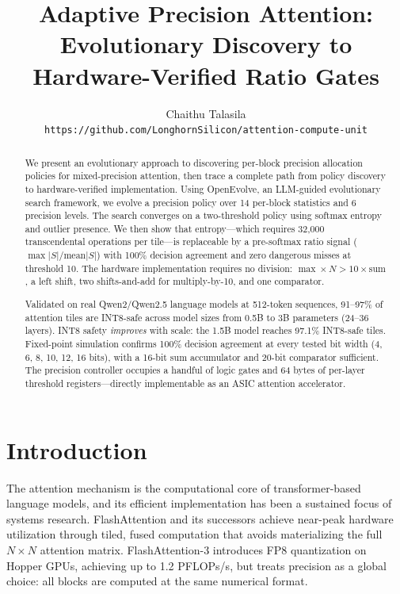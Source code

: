 \documentclass[10pt,twocolumn]{article}
\title{\textbf{Adaptive Precision Attention:\\
Evolutionary Discovery to Hardware-Verified Ratio Gates}}
\author{
  Chaithu Talasila\\
  \texttt{https://github.com/LonghornSilicon/attention-compute-unit}
}
\date{}
\begin{document}
\maketitle
\thispagestyle{fancy}

\begin{abstract}
We present an evolutionary approach to discovering per-block precision
allocation policies for mixed-precision attention, then trace a complete
path from policy discovery to hardware-verified implementation.
Using OpenEvolve, an LLM-guided evolutionary search framework, we evolve a
precision policy over 14 per-block statistics and 6 precision levels.
The search converges on a two-threshold policy using softmax entropy and
outlier presence. We then show that entropy---which requires 32{,}000
transcendental operations per tile---is replaceable by a pre-softmax
ratio signal ($\max|S|/\mathrm{mean}|S|$) with 100\% decision agreement
and zero dangerous misses at threshold 10. The hardware implementation
requires no division: $\max \times N > 10 \times \mathrm{sum}$, a left
shift, two shifts-and-add for multiply-by-10, and one comparator.

Validated on real Qwen2/Qwen2.5 language models at 512-token sequences,
91--97\% of attention tiles are INT8-safe across model sizes from 0.5B
to 3B parameters (24--36 layers). INT8 safety \emph{improves} with scale:
the 1.5B model reaches 97.1\% INT8-safe tiles. Fixed-point simulation
confirms 100\% decision agreement at every tested bit width (4, 6, 8,
10, 12, 16 bits), with a 16-bit sum accumulator and 20-bit comparator
sufficient. The precision controller occupies a handful of logic gates
and 64 bytes of per-layer threshold registers---directly implementable
as an ASIC attention accelerator.
\end{abstract}

\section{Introduction}

The attention mechanism is the computational core of transformer-based
language models, and its efficient implementation has been a sustained
focus of systems research. FlashAttention \citep{dao2022flashattention}
and its successors \citep{dao2023flashattention2,shah2024flashattention3}
achieve near-peak hardware utilization through tiled, fused computation
that avoids materializing the full $N \times N$ attention matrix.
FlashAttention-3 introduces FP8 quantization on Hopper GPUs, achieving
up to 1.2 PFLOPs/s, but treats precision as a global choice: all blocks
are computed at the same numerical format.
\end{document}
